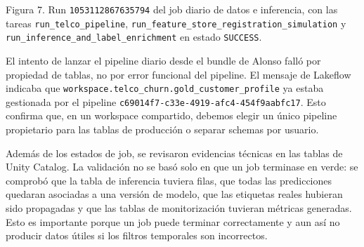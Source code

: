\documentclass[12pt,a4paper]{article}
\begin{document}
Figura 7. Run \nolinkurl{1053112867635794} del job diario de datos e inferencia, con las tareas \nolinkurl{run_telco_pipeline}, \nolinkurl{run_feature_store_registration_simulation} y \nolinkurl{run_inference_and_label_enrichment} en estado \nolinkurl{SUCCESS}.\par

El intento de lanzar el pipeline diario desde el bundle de Alonso falló por propiedad de tablas, no por error funcional del pipeline. El mensaje de Lakeflow indicaba que \nolinkurl{workspace.telco_churn.gold_customer_profile} ya estaba gestionada por el pipeline \nolinkurl{c69014f7-c33e-4919-afc4-454f9aabfc17}. Esto confirma que, en un workspace compartido, debemos elegir un único pipeline propietario para las tablas de producción o separar schemas por usuario.\par

Además de los estados de job, se revisaron evidencias técnicas en las tablas de Unity Catalog. La validación no se basó solo en que un job terminase en verde: se comprobó que la tabla de inferencia tuviera filas, que todas las predicciones quedaran asociadas a una versión de modelo, que las etiquetas reales hubieran sido propagadas y que las tablas de monitorización tuvieran métricas generadas. Esto es importante porque un job puede terminar correctamente y aun así no producir datos útiles si los filtros temporales son incorrectos.\par
\end{document}
